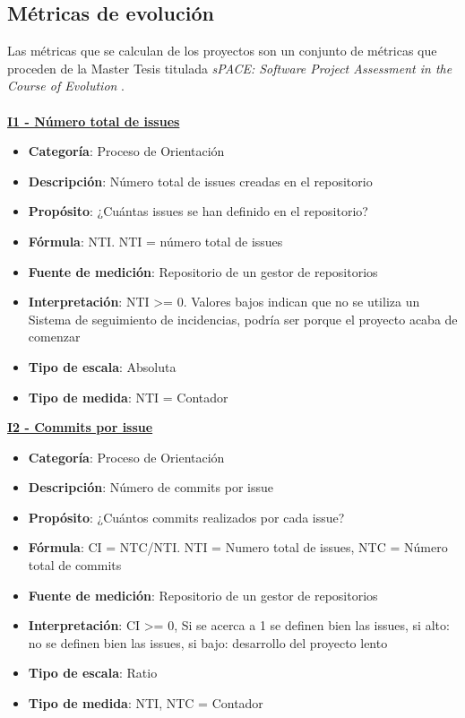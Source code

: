 \subsection{Métricas de evolución}
Las métricas que se calculan de los proyectos son un conjunto de métricas que proceden de la Master Tesis titulada \textit{sPACE: Software Project Assessment in the Course of Evolution} \cite{ratzinger_space:_2007}.\\\\
\textbf{\underline{I1 - Número total de issues}}
\begin{itemize}
	\tightlist
	\item \textbf{Categoría}: Proceso de Orientación
	\item \textbf{Descripción}: Número total de issues creadas en el repositorio
	\item \textbf{Propósito}: ¿Cuántas issues se han definido en el repositorio?
	\item \textbf{Fórmula}: NTI. NTI = número total de issues
	\item \textbf{Fuente de medición}: Repositorio de un gestor de repositorios
	\item \textbf{Interpretación}: NTI >= 0. Valores bajos indican que no se utiliza un Sistema de seguimiento de incidencias, podría ser porque el proyecto acaba de comenzar
	\item \textbf{Tipo de escala}: Absoluta
	\item \textbf{Tipo de medida}: NTI = Contador
\end{itemize}
\textbf{\underline{I2 - Commits por issue}}
\begin{itemize}
	\tightlist
	\item \textbf{Categoría}: Proceso de Orientación
	\item \textbf{Descripción}: Número de commits por issue
	\item \textbf{Propósito}: ¿Cuántos commits realizados por cada issue?
	\item \textbf{Fórmula}: CI = NTC/NTI. NTI = Numero total de issues, NTC = Número total de commits
	\item \textbf{Fuente de medición}: Repositorio de un gestor de repositorios
	\item \textbf{Interpretación}: CI >= 0, Si se acerca a 1 se definen bien las issues, si alto: no se definen bien las issues, si bajo: desarrollo del proyecto lento
	\item \textbf{Tipo de escala}: Ratio 
	\item \textbf{Tipo de medida}: NTI, NTC = Contador
\end{itemize}
